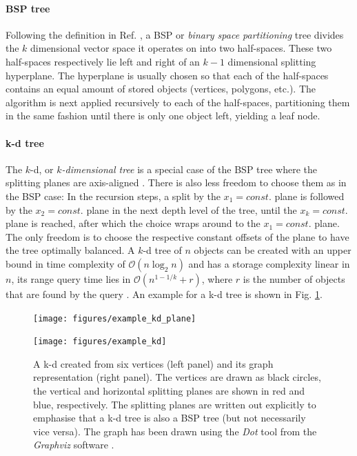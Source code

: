 \paragraph{BSP tree}
Following the definition in Ref. \cite[pp. 261-262]{Berg2008}, a BSP or \textit{binary space partitioning} 
tree divides the $k$ dimensional vector space it operates on into two half-spaces. 
These two half-spaces respectively lie left and right of 
an $k-1$ dimensional splitting hyperplane. The hyperplane is usually chosen so that each of the 
half-spaces contains an equal amount of stored objects (vertices, polygons, etc.). 
The algorithm is next applied recursively to each of the half-spaces, partitioning them in the same
fashion until there is only one object left, yielding a leaf node.


\paragraph{k-d tree}
The $k$-d, or \textit{$k$-dimensional tree} is a special case of the BSP tree where the splitting planes are 
axis-aligned \cite[p. 278]{Berg2008}. 
There is also less freedom to choose them as in the BSP case: In the recursion steps, a split by 
the $x_1 = const.$ plane is followed by the $x_2 = const.$ plane in the next depth level of the tree,
until the $x_k = const.$ plane is reached, after which the choice wraps around to the
$x_1 = const.$ plane. The only freedom is to choose the respective constant offsets of the
plane to have the tree optimally balanced.
A $k$-d tree of $n$ objects can be created with an upper bound in time complexity of 
$\mathcal{O}\left( n \log_2 n \right)$ and has a storage complexity linear in $n$,
its range query time lies in $\mathcal{O}\left( n^{1-1/k} + r \right)$, where $r$ is the number of
objects that are found by the query \cite[p. 105]{Berg2008}.
An example for a k-d tree is shown in Fig. \ref{fig:example_kdtree}.

\begin{figure}[h]
	\begin{center}
		\begin{minipage}{0.4 \textwidth}
			\texttt{[image: figures/example\_kd\_plane]}
		\end{minipage}
		\hspace{0.1cm}
		\begin{minipage}{0.58 \textwidth}
			\texttt{[image: figures/example\_kd]}
		\end{minipage}
	\end{center}
	\caption[Example k-d tree.]{A k-d created from six vertices (left panel) and its graph representation (right panel).
		The vertices are drawn as black circles, the vertical and horizontal splitting planes
		are shown in red and blue, respectively.
		The splitting planes are written out explicitly to emphasise that a
		k-d tree is also a BSP tree (but not necessarily vice versa).
		The graph has been drawn using the \textit{Dot} tool from the \textit{Graphviz} software \cite{Ellson2003}.
		\label{fig:example_kdtree}}
\end{figure}


